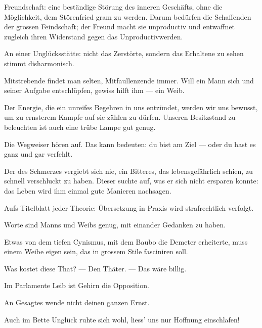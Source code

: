 Freundschaft: eine beständige Störung des inneren Geschäfts, ohne die Möglichkeit, dem Störenfried gram zu werden. Darum bedürfen die Schaffenden der grossen Feindschaft; der Freund macht sie unproductiv und entwaffnet zugleich ihren Widerstand gegen das Unproductivwerden.
\par

An einer Unglücksstätte: nicht das Zerstörte, sondern das Erhaltene zu sehen stimmt disharmonisch.
\par

Mitstrebende findet man selten, Mitfaullenzende immer. Will ein Mann sich und seiner Aufgabe entschlüpfen, gewiss hilft ihm — ein Weib.
\par

Der Energie, die ein unreifes Begehren in uns entzündet, werden wir uns bewusst, um zu ernsterem Kampfe auf sie zählen zu dürfen. Unseren Besitzstand zu beleuchten ist auch eine trübe Lampe gut genug.
\par

Die Wegweiser hören auf. Das kann bedeuten: du bist am Ziel — oder du hast es ganz und gar verfehlt.
\par

Der  des Schmerzes vergiebt sich nie, ein Bitteres, das lebensgefährlich schien, zu schnell verschluckt zu haben. Dieser suchte auf, was er sich nicht ersparen konnte: das Leben wird ihm einmal gute Manieren nachsagen.
\par

Aufs Titelblatt jeder Theorie: Übersetzung in Praxis wird strafrechtlich verfolgt.
\par

Worte sind Manns und Weibs genug, mit einander Gedanken zu haben.
\par

Etwas von dem tiefen Cynismus, mit dem Baubo die Demeter erheiterte, muss einem Weibe eigen sein, das in grossem Stile fasciniren soll.
\par

Was kostet diese That? — Den Thäter. — Das wäre billig.
\par

Im Parlamente Leib ist Gehirn die Opposition.
\par

An Gesagtes wende nicht deinen ganzen Ernst.
\par

Auch im Bette Unglück ruhte sich wohl, liess’ uns nur Hoffnung einschlafen!
\par

